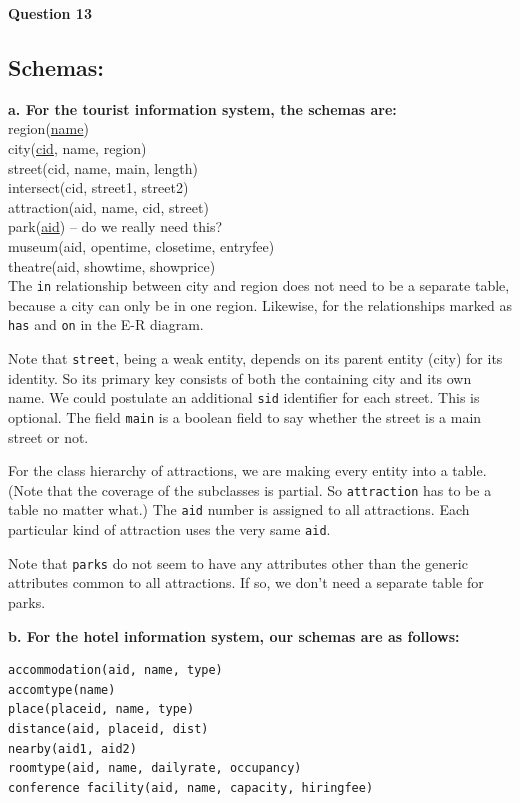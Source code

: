 
% 


\textbf{Question 13}

\subsection*{Schemas:}

\textbf{a. For the tourist information system, the schemas are:} \\
region(\underline{name}) \\
city(\underline{cid}, name, region) \\
street(cid, name, main, length) \\
intersect(cid, street1, street2) \\
attraction(aid, name, cid, street) \\
park(\underline{aid}) -- do we really need this? \\
museum(aid, opentime, closetime, entryfee) \\
theatre(aid, showtime, showprice) \\

The \texttt{in} relationship between city and region does not need to be a separate table, because a city can only be
in one region. Likewise, for the relationships marked as \texttt{has} and \texttt{on} in the E-R diagram.

Note that \texttt{street}, being a weak entity, depends on its parent entity (city) for its identity. So its primary key
consists of both the containing city and its own name. We could postulate an additional \texttt{sid} identifier for
each street. This is optional. The field \texttt{main} is a boolean field to say whether the street is a main street or
not.

For the class hierarchy of attractions, we are making every entity into a table. (Note that the coverage of the
subclasses is partial. So \texttt{attraction} has to be a table no matter what.) The \texttt{aid} number is assigned to
all attractions. Each particular kind of attraction uses the very same \texttt{aid}.

Note that \texttt{parks} do not seem to have any attributes other than the generic attributes common to all attractions.
If so, we don’t need a separate table for parks.

\textbf{b. For the hotel information system, our schemas are as follows:} \\
\begin{verbatim}
accommodation(aid, name, type)
accomtype(name)
place(placeid, name, type)
distance(aid, placeid, dist)
nearby(aid1, aid2)
roomtype(aid, name, dailyrate, occupancy)
conference facility(aid, name, capacity, hiringfee)
\end{verbatim}

